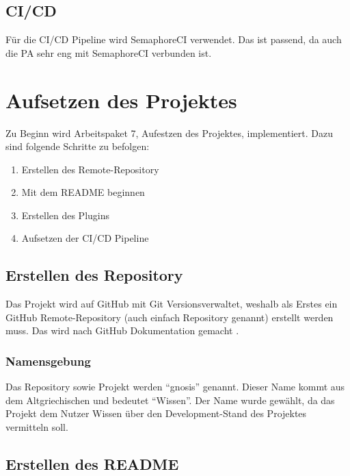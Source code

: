 \subsection{CI/CD}
Für die CI/CD Pipeline wird SemaphoreCI verwendet. Das ist passend, da auch die PA sehr eng mit SemaphoreCI verbunden
ist. \newline

\begin{minipage}{\textwidth}
  \section{Aufsetzen des Projektes}
  Zu Beginn wird Arbeitspaket 7, Aufestzen des Projektes, implementiert. Dazu sind folgende Schritte zu befolgen:
  \begin{enumerate}
    \item Erstellen des Remote-Repository
    \item Mit dem README beginnen
    \item Erstellen des Plugins
    \item Aufsetzen der CI/CD Pipeline \newline
  \end{enumerate}
\end{minipage}

\begin{minipage}{\textwidth}
  \subsection{Erstellen des Repository}
  Das Projekt wird auf GitHub mit Git Versionsverwaltet, weshalb als Erstes ein GitHub Remote-Repository (auch einfach
  Repository genannt) erstellt werden muss. Das wird nach GitHub Dokumentation gemacht \cite{github_create_repo}.
  \subsubsection{Namensgebung}
  Das Repository sowie Projekt werden \enquote{gnosis} genannt. Dieser Name kommt aus dem Altgriechischen und bedeutet
  \enquote{Wissen}. Der Name wurde gewählt, da das Projekt dem Nutzer Wissen über den Development-Stand des Projektes
  vermitteln soll. 
\end{minipage}

\begin{minipage}{\textwidth}
  \subsection{Erstellen des README}

\end{minipage}
